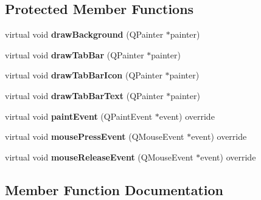 \subsection*{Protected Member Functions}
\begin{DoxyCompactItemize}
\item 
\mbox{\label{class_q_qt_slide_tab_bar_a46f4241c6d34c30758ce7de11fd182d6}} 
virtual void {\bfseries draw\+Background} (Q\+Painter $\ast$painter)
\item 
\mbox{\label{class_q_qt_slide_tab_bar_a8667133628ded6e70bbe329bc0c01271}} 
virtual void {\bfseries draw\+Tab\+Bar} (Q\+Painter $\ast$painter)
\item 
\mbox{\label{class_q_qt_slide_tab_bar_a26a886da330208d8cdad77fcd49b6956}} 
virtual void {\bfseries draw\+Tab\+Bar\+Icon} (Q\+Painter $\ast$painter)
\item 
\mbox{\label{class_q_qt_slide_tab_bar_a535b95890c75f38bebb9dafbf220601d}} 
virtual void {\bfseries draw\+Tab\+Bar\+Text} (Q\+Painter $\ast$painter)
\item 
\mbox{\label{class_q_qt_slide_tab_bar_a8d47cf62d7bcd99911b55390f2c8d072}} 
virtual void {\bfseries paint\+Event} (Q\+Paint\+Event $\ast$event) override
\item 
\mbox{\label{class_q_qt_slide_tab_bar_a3f300e574ccef8763c57b8513ff94b23}} 
virtual void {\bfseries mouse\+Press\+Event} (Q\+Mouse\+Event $\ast$event) override
\item 
\mbox{\label{class_q_qt_slide_tab_bar_ae6c7dac01baecb3bf6923e438cc28c70}} 
virtual void {\bfseries mouse\+Release\+Event} (Q\+Mouse\+Event $\ast$event) override
\end{DoxyCompactItemize}


\subsection{Member Function Documentation}
\mbox{\label{class_q_qt_slide_tab_bar_ad78c261ab8f1fafdf3a1af5d29677b2a}} 
